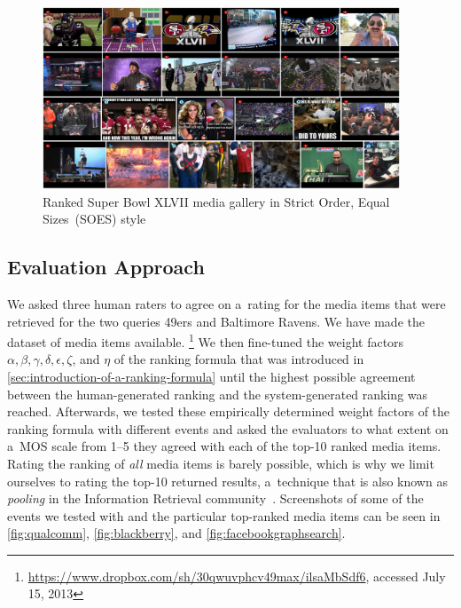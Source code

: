 \begin{figure}
  \centering  \includegraphics[width=0.95\textwidth,height=0.9\textheight,keepaspectratio]{strict_order.png}
  \caption[Ranked Super Bowl media gallery in Strict Order, Equal Sizes style]
  {Ranked Super Bowl XLVII media gallery in Strict Order, Equal Sizes~(SOES) style }
  \label{fig:strict_order}
\end{figure}

\subsection{Evaluation Approach}

We asked three human raters to agree on a~rating for the media items
that were retrieved for the two queries 49ers and Baltimore Ravens.
We have made the dataset of media items available.%
\footnote{\url{https://www.dropbox.com/sh/30qwuvphcv49max/ilsaMbSdf6},
accessed July 15, 2013}
We then fine-tuned the weight factors
$ \alpha, \beta, \gamma, \delta, \epsilon, \zeta $, and $ \eta $ of the ranking formula
that was introduced in \autoref{sec:introduction-of-a-ranking-formula}
until the highest possible agreement between the human-generated ranking
and the system-generated ranking was reached.
Afterwards, we tested these empirically determined weight factors of the ranking formula
with different events and asked the evaluators to what extent
on a~MOS scale from 1--5 they agreed with each of the top-10 ranked media items.
Rating the ranking of \emph{all} media items is barely possible,
which is why we limit ourselves to rating the top-10 returned results,
a~technique that is also known as \emph{pooling}
in the Information Retrieval community~\cite{liu2009learningtorank}.
Screenshots of some of the events we tested with
and the particular top-ranked media items can be seen in
\autoref{fig:qualcomm}, \autoref{fig:blackberry}, and \autoref{fig:facebookgraphsearch}.

